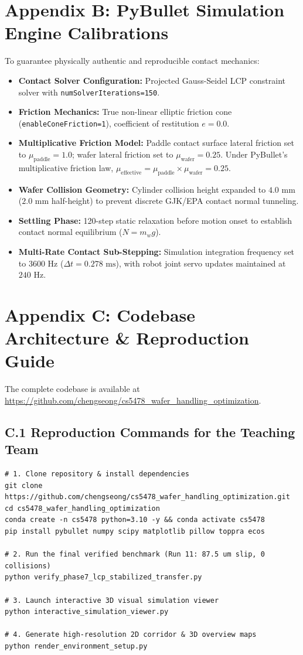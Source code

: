 \documentclass{article}
\begin{document}
\section*{Appendix B: PyBullet Simulation Engine Calibrations}
To guarantee physically authentic and reproducible contact mechanics:
\begin{itemize}
    \item \textbf{Contact Solver Configuration:} Projected Gauss-Seidel LCP constraint solver with \texttt{numSolverIterations=150}.
    \item \textbf{Friction Mechanics:} True non-linear elliptic friction cone (\texttt{enableConeFriction=1}), coefficient of restitution $e = 0.0$.
    \item \textbf{Multiplicative Friction Model:} Paddle contact surface lateral friction set to $\mu_{\text{paddle}} = 1.0$; wafer lateral friction set to $\mu_{\text{wafer}} = 0.25$. Under PyBullet's multiplicative friction law, $\mu_{\text{effective}} = \mu_{\text{paddle}} \times \mu_{\text{wafer}} = 0.25$.
    \item \textbf{Wafer Collision Geometry:} Cylinder collision height expanded to $4.0\text{ mm}$ ($2.0\text{ mm}$ half-height) to prevent discrete GJK/EPA contact normal tunneling.
    \item \textbf{Settling Phase:} 120-step static relaxation before motion onset to establish contact normal equilibrium ($N = m_w g$).
    \item \textbf{Multi-Rate Contact Sub-Stepping:} Simulation integration frequency set to $3600\text{ Hz}$ ($\Delta t = 0.278\text{ ms}$), with robot joint servo updates maintained at $240\text{ Hz}$.
\end{itemize}

\section*{Appendix C: Codebase Architecture \& Reproduction Guide}
The complete codebase is available at \url{https://github.com/chengseong/cs5478_wafer_handling_optimization}.

\subsection*{C.1 Reproduction Commands for the Teaching Team}
\begin{verbatim}
# 1. Clone repository & install dependencies
git clone https://github.com/chengseong/cs5478_wafer_handling_optimization.git
cd cs5478_wafer_handling_optimization
conda create -n cs5478 python=3.10 -y && conda activate cs5478
pip install pybullet numpy scipy matplotlib pillow toppra ecos

# 2. Run the final verified benchmark (Run 11: 87.5 um slip, 0 collisions)
python verify_phase7_lcp_stabilized_transfer.py

# 3. Launch interactive 3D visual simulation viewer
python interactive_simulation_viewer.py

# 4. Generate high-resolution 2D corridor & 3D overview maps
python render_environment_setup.py
\end{verbatim}
\end{document}
